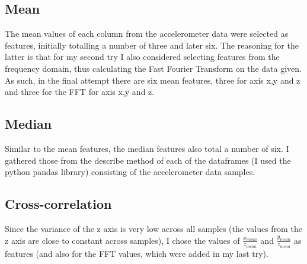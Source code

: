 \documentclass{article}
\begin{document}
\subsection{Mean}
The mean values of each column from the accelerometer data were selected as features, initially totalling a number of three and later six. The reasoning for the latter is that for my second try I also considered selecting features from the frequency domain, thus calculating the Fast Fourier Transform on the data given. As such, in the final attempt there are six mean features, three for axis x,y and z and three for the FFT for axis x,y and z.

\subsection{Median}
Similar to the mean features, the median features also total a number of six. I gathered those from the describe method of each of the dataframes (I used the python pandas\cite{pandas} library) consisting of the accelerometer data samples.

\subsection{Cross-correlation}
Since the variance of the z axis is very low across all samples (the values from the z axis are close to constant across samples), I chose the values of $\displaystyle\frac{x_{mean}}{z_{mean}}$ and $\displaystyle\frac{y_{mean}}{z_{mean}}$ as features (and also for the FFT values, which were added in my last try).
\end{document}
